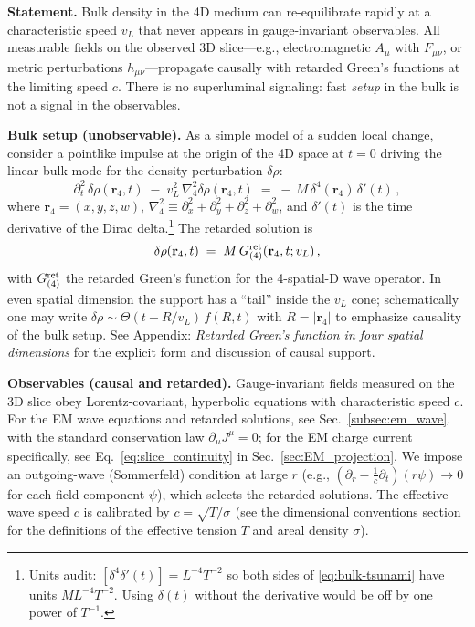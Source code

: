 \textbf{Statement.} Bulk density in the 4D medium can re-equilibrate rapidly at a characteristic speed $v_L$ that never appears in gauge-invariant observables. All measurable fields on the observed 3D slice---e.g., electromagnetic $A_\mu$ with $F_{\mu\nu}$, or metric perturbations $h_{\mu\nu}$---propagate causally with retarded Green's functions at the limiting speed $c$. There is no superluminal signaling: fast \emph{setup} in the bulk is not a signal in the observables.

\medskip
\noindent\textbf{Bulk setup (unobservable).} As a simple model of a sudden local change, consider a pointlike impulse at the origin of the 4D space at $t=0$ driving the linear bulk mode for the density perturbation $\delta\rho$:
\begin{equation}
\partial_t^2 \,\delta\rho(\mathbf r_4,t)\;-\; v_L^2 \,\nabla_4^2 \delta\rho(\mathbf r_4,t)
\;=\; -\,M\,\delta^4(\mathbf r_4)\,\delta'(t)\,,
\label{eq:bulk-tsunami}
\end{equation}
where $\mathbf r_4=(x,y,z,w)$, $\nabla_4^2\!\equiv\!\partial_x^2{+}\partial_y^2{+}\partial_z^2{+}\partial_w^2$, and $\delta'(t)$ is the time derivative of the Dirac delta.\footnote{Units audit: $[\delta^4\delta'(t)]=L^{-4}T^{-2}$ so both sides of \eqref{eq:bulk-tsunami} have units $ML^{-4}T^{-2}$. Using $\delta(t)$ without the derivative would be off by one power of $T^{-1}$.}
The retarded solution is
\begin{equation}
\delta\rho(\mathbf r_4,t)\;=\;M\,G^{\rm ret}_{(4)}(\mathbf r_4,t;v_L)\,,
\end{equation}
with $G^{\rm ret}_{(4)}$ the retarded Green's function for the 4-spatial-D wave operator. In even spatial dimension the support has a “tail” inside the $v_L$ cone; schematically one may write $\delta\rho \sim \Theta(t{-}R/v_L)\,f(R,t)$ with $R=|\mathbf r_4|$ to emphasize causality of the bulk setup. See Appendix: \emph{Retarded Green's function in four spatial dimensions} for the explicit form and discussion of causal support.

\medskip
\noindent\textbf{Observables (causal and retarded).} Gauge-invariant fields measured on the 3D slice obey Lorentz-covariant, hyperbolic equations with characteristic speed $c$. For the EM wave equations and retarded solutions, see Sec.~\ref{subsec:em_wave}.
with the standard conservation law $\partial_\mu J^\mu=0$; for the EM charge current specifically, see Eq.~\ref{eq:slice_continuity} in Sec.~\ref{sec:EM_projection}. We impose an outgoing-wave (Sommerfeld) condition at large $r$ (e.g., $(\partial_r-\tfrac1c\partial_t)(r\psi)\!\to\!0$ for each field component $\psi$), which selects the retarded solutions. The effective wave speed $c$ is calibrated by $c=\sqrt{T/\sigma}$ (see the dimensional conventions section for the definitions of the effective tension $T$ and areal density $\sigma$).

